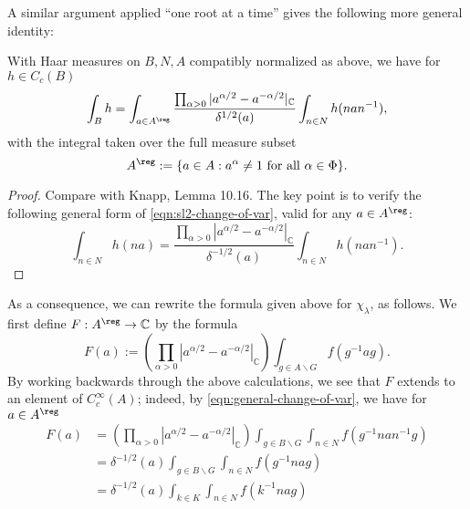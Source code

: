 \documentclass[reqno]{amsart} 
\begin{document}
A similar argument applied ``one root at a time'' gives the following more general identity:
\begin{lemma}\label{lem:change-variables-N-A}
  With Haar measures on $B,N,A$ compatibly normalized as above, we have for $h \in C_c(B)$
  \begin{equation*}
    \int_B
    h
    =
    \int_{a \in A^{\reg}}
    \frac{\prod _{\alpha > 0}  | a^{\alpha/2} -  a^{-\alpha/2}
      |_{\mathbb{C}}}
    {
      \delta^{1/2}(a)
    }
    \int_{n \in N}
    h (n a n^{-1}),
  \end{equation*}
  with the integral taken over the full measure subset
  \begin{equation*}
    A^{\reg}  := \{a \in A : a^\alpha \neq 1 \text{ for all }
    \alpha \in \Phi\}.
  \end{equation*}
\end{lemma}
\begin{proof}
  Compare with Knapp, Lemma 10.16.  The key point is to verify the following general form of \eqref{eqn:sl2-change-of-var}, valid for any $a \in A^{\reg}$:
  \begin{equation}\label{eqn:general-change-of-var}
    \int_{n \in N}
    h (n a)
    =
    \frac {
      \prod_{\alpha > 0}
      |a^{\alpha/2} - a^{-\alpha/2}|_{\mathbb{C}}
    }
    {
      \delta^{-1/2}(a)
    }
    \int_{n \in N}
    h (n a n^{-1}).
  \end{equation}  
\end{proof}
As a consequence, we can rewrite the formula given above for $\chi_\lambda$, as follows.  We first define $F : A^{\reg} \rightarrow \mathbb{C}$ by the formula
\begin{equation}\label{eqn:formula-for-F-on-regular-a}
  F(a) :=
  (\prod_{\alpha > 0}
  |a^{\alpha/2} - a^{-\alpha/2}|_{\mathbb{C}})
  \int_{g \in A \backslash G}
  f(g^{-1} a g).
\end{equation}
By working backwards through the above calculations, we see that $F$ extends to an element of $C_c^\infty(A)$; indeed, by \eqref{eqn:general-change-of-var}, we have for $a \in A^{\reg}$
\begin{align*}
  F(a)
  &=
    (\prod_{\alpha > 0}
    |a^{\alpha/2} - a^{-\alpha/2}|_{\mathbb{C}})
    \int_{g \in B \backslash G}
    \int_{n \in N}
    f(g^{-1} n a n^{-1} g)
  \\
  &=
    \delta^{-1/2}(a)
    \int_{g \in B \backslash G}
    \int_{n \in N}
    f(g^{-1} n a g)
  \\
  &=
    \delta^{-1/2}(a)
    \int_{k \in K}
    \int_{n \in N}
    f(k^{-1} n a g)
\end{align*}
\end{document}
